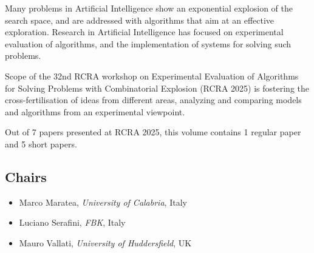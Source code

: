 \documentclass[
]{ceurart}
\begin{document}
\maketitle


\noindent
Many problems in Artificial Intelligence show an exponential explosion of the search space, and are addressed with algorithms that aim at an effective exploration.  Research in Artificial Intelligence has focused on experimental evaluation of algorithms, and the implementation of systems for solving such problems.

 

Scope of the 32nd RCRA workshop on Experimental Evaluation of Algorithms for Solving Problems with Combinatorial Explosion (RCRA 2025) is fostering the cross-fertilisation of ideas from different areas, analyzing and comparing models and algorithms from an experimental viewpoint.

 

Out of 7 papers presented at RCRA 2025, this volume contains 1 regular paper and 5 short papers.

\subsection*{Chairs}
\begin{itemize}
  \item Marco Maratea, \emph{University of Calabria}, Italy
  \item Luciano Serafini, \emph{FBK}, Italy
  \item Mauro Vallati, \emph{University of Huddersfield}, UK
\end{itemize}
\end{document}
